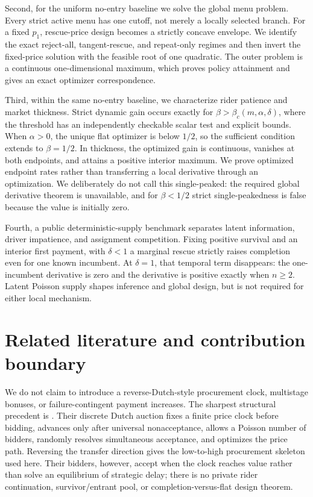 \documentclass[mnsc,dblanonrev]{informs4}
\begin{document}
Second, for the uniform no-entry baseline we solve the global menu problem.
Every strict active menu has one cutoff, not merely a locally selected branch.
For a fixed $p_1$, rescue-price design becomes a strictly concave envelope.
We identify the exact reject-all, tangent-rescue, and repeat-only regimes and
then invert the fixed-price solution with the feasible root of one quadratic.
The outer problem is a continuous one-dimensional maximum, which proves
policy attainment and gives an exact optimizer correspondence.

Third, within the same no-entry baseline, we characterize rider patience and
market thickness.  Strict dynamic gain occurs exactly for
$\beta>\beta_c(m,\alpha,\delta)$, where the threshold has an
  independently checkable scalar test and explicit bounds.  When $\alpha>0$,
the unique flat optimizer is below $1/2$, so the sufficient condition extends
to $\beta=1/2$.  In thickness, the optimized gain is continuous, vanishes at
both endpoints, and attains a positive interior maximum.  We prove optimized
endpoint rates rather than transferring a local derivative through an
optimization.  We deliberately do not call this single-peaked: the required
global derivative theorem is unavailable, and for $\beta<1/2$ strict
single-peakedness is false because the value is initially zero.

Fourth, a public deterministic-supply benchmark separates latent information,
driver impatience, and assignment competition.  Fixing positive survival and
an interior first payment, with $\delta<1$ a marginal rescue strictly raises
completion even for one known incumbent.  At
$\delta=1$, that temporal term disappears: the one-incumbent derivative is
zero and the derivative is positive exactly when $n\ge2$.  Latent Poisson
supply shapes inference and global design, but is not required for either
local mechanism.

\section{Related literature and contribution boundary}
\label{sec:literature}

We do not claim to introduce a reverse-Dutch-style procurement clock,
multistage bonuses, or failure-contingent payment increases.  The sharpest
structural precedent is \citet{LiKuo2013}.  Their discrete Dutch auction fixes
a finite price clock before bidding, advances only after universal
nonacceptance, allows a Poisson number of bidders, randomly resolves
simultaneous acceptance, and optimizes the price path.  Reversing the transfer
direction gives the low-to-high procurement skeleton used here.  Their bidders,
however, accept when the clock reaches value rather than solve an equilibrium
of strategic delay; there is no private rider continuation, survivor/entrant
pool, or completion-versus-flat design theorem.
\end{document}
